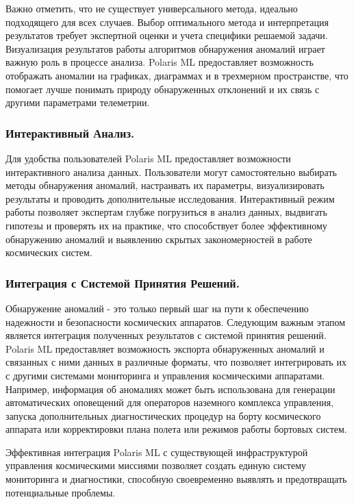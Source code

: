 \documentclass[14pt, a4paper]{extreport}
\begin{document}
    Важно отметить, что не существует универсального метода, идеально подходящего для всех случаев.
    Выбор оптимального метода и интерпретация результатов требует экспертной оценки и учета специфики решаемой задачи.
    Визуализация результатов работы алгоритмов обнаружения аномалий играет важную роль в процессе анализа.
    Polaris ML предоставляет возможность отображать аномалии на графиках, диаграммах и в трехмерном пространстве, что помогает лучше понимать природу обнаруженных отклонений и их связь с другими параметрами телеметрии.

    \subsubsection{Интерактивный Анализ.}

    Для удобства пользователей Polaris ML предоставляет возможности интерактивного анализа данных.
    Пользователи могут самостоятельно выбирать методы обнаружения аномалий, настраивать их параметры, визуализировать результаты и проводить дополнительные исследования.
    Интерактивный режим работы позволяет экспертам глубже погрузиться в анализ данных, выдвигать гипотезы и проверять их на практике, что способствует более эффективному обнаружению аномалий и выявлению скрытых закономерностей в работе космических систем.

    \subsubsection{Интеграция с Системой Принятия Решений.}

    Обнаружение аномалий - это только первый шаг на пути к обеспечению надежности и безопасности космических аппаратов.
    Следующим важным этапом является интеграция полученных результатов с системой принятия решений.
    Polaris ML предоставляет возможность экспорта обнаруженных аномалий и связанных с ними данных в различные форматы, что позволяет интегрировать их с другими системами мониторинга и управления космическими аппаратами.
    Например, информация об аномалиях может быть использована для генерации автоматических оповещений для операторов наземного комплекса управления,
    запуска дополнительных диагностических процедур на борту космического аппарата или корректировки плана полета или режимов работы бортовых систем.

    Эффективная интеграция Polaris ML с существующей инфраструктурой управления космическими миссиями позволяет создать единую систему мониторинга и диагностики, способную своевременно выявлять и предотвращать потенциальные проблемы.
\end{document}
